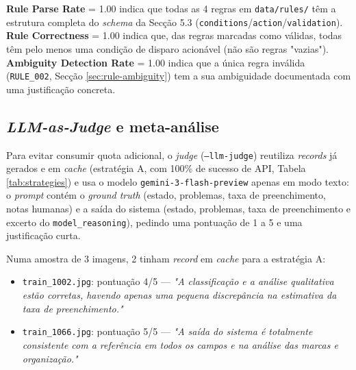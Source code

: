 \documentclass[conference]{IEEEtran}
\begin{document}
\textbf{Rule Parse Rate} = 1.00 indica que todas as 4 regras em
\texttt{data/rules/} têm a estrutura completa do \textit{schema} da Secção
5.3 (\texttt{conditions}/\texttt{action}/\texttt{validation}).
\textbf{Rule Correctness} = 1.00 indica que, das regras marcadas como
válidas, todas têm pelo menos uma condição de disparo acionável (não são
regras "vazias"). \textbf{Ambiguity Detection Rate} = 1.00 indica que a
única regra inválida (\texttt{RULE\_002}, Secção \ref{sec:rule-ambiguity})
tem a sua ambiguidade documentada com uma justificação concreta.

\subsection{\textit{LLM-as-Judge} e meta-análise}
\label{sec:judge}

Para evitar consumir quota adicional, o \textit{judge}
(\texttt{--llm-judge}) reutiliza \textit{records} já gerados e em
\textit{cache} (estratégia A, com 100\% de sucesso de API, Tabela
\ref{tab:strategies}) e usa o modelo \texttt{gemini-3-flash-preview} apenas
em modo texto: o \textit{prompt} contém o \textit{ground truth} (estado,
problemas, taxa de preenchimento, notas humanas) e a saída do sistema
(estado, problemas, taxa de preenchimento e excerto do
\texttt{model\_reasoning}), pedindo uma pontuação de 1 a 5 e uma
justificação curta.

Numa amostra de 3 imagens, 2 tinham \textit{record} em \textit{cache} para a
estratégia A:

\begin{itemize}
  \item \texttt{train\_1002.jpg}: pontuação 4/5 --- \textit{"A
  classificação e a análise qualitativa estão corretas, havendo apenas uma
  pequena discrepância na estimativa da taxa de preenchimento."}
  \item \texttt{train\_1066.jpg}: pontuação 5/5 --- \textit{"A saída do
  sistema é totalmente consistente com a referência em todos os campos e na
  análise das marcas e organização."}
\end{itemize}
\end{document}

